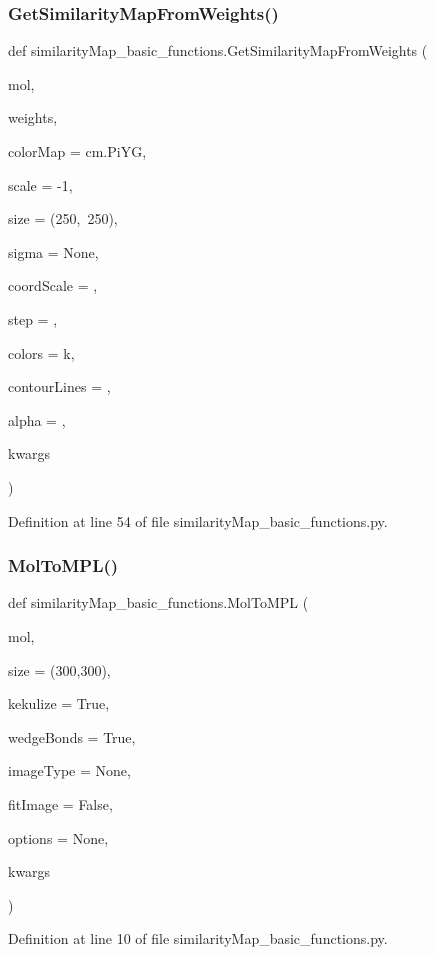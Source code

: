 \subsubsection{\texorpdfstring{Get\+Similarity\+Map\+From\+Weights()}{GetSimilarityMapFromWeights()}}
{\footnotesize\ttfamily def similarity\+Map\+\_\+basic\+\_\+functions.\+Get\+Similarity\+Map\+From\+Weights (\begin{DoxyParamCaption}\item[{}]{mol,  }\item[{}]{weights,  }\item[{}]{color\+Map = {\ttfamily cm.PiYG},  }\item[{}]{scale = {\ttfamily -\/1},  }\item[{}]{size = {\ttfamily (250,~250)},  }\item[{}]{sigma = {\ttfamily None},  }\item[{}]{coord\+Scale = {},  }\item[{}]{step = {},  }\item[{}]{colors = {\ttfamily \textquotesingle{}k\textquotesingle{}},  }\item[{}]{contour\+Lines = {},  }\item[{}]{alpha = {},  }\item[{}]{kwargs }\end{DoxyParamCaption})}



Definition at line 54 of file similarity\+Map\+\_\+basic\+\_\+functions.\+py.

\mbox{\label{namespacesimilarity_map__basic__functions_a5ab36705860454e61699e49334092bfa}} 
\subsubsection{\texorpdfstring{Mol\+To\+M\+P\+L()}{MolToMPL()}}
{\footnotesize\ttfamily def similarity\+Map\+\_\+basic\+\_\+functions.\+Mol\+To\+M\+PL (\begin{DoxyParamCaption}\item[{}]{mol,  }\item[{}]{size = {\ttfamily (300,300)},  }\item[{}]{kekulize = {\ttfamily True},  }\item[{}]{wedge\+Bonds = {\ttfamily True},  }\item[{}]{image\+Type = {\ttfamily None},  }\item[{}]{fit\+Image = {\ttfamily False},  }\item[{}]{options = {\ttfamily None},  }\item[{}]{kwargs }\end{DoxyParamCaption})}



Definition at line 10 of file similarity\+Map\+\_\+basic\+\_\+functions.\+py.

